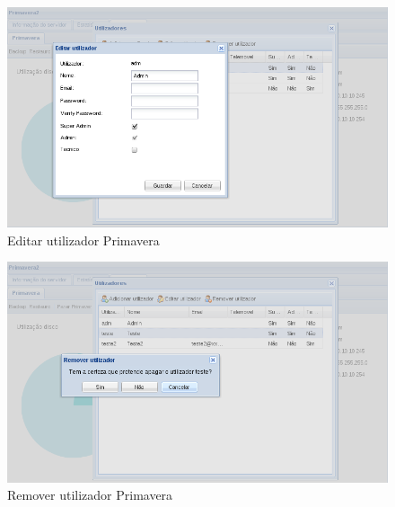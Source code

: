 \begin{figure}[H]
    \begin{center}
    \includegraphics[scale=0.38]{screenshots/primavera/primaverainterface_09.png}
    \caption{Editar utilizador Primavera}
    \label{fig:primavera_edit_user}
    \end{center}
\end{figure}

\begin{figure}[H]
    \begin{center}
    \includegraphics[scale=0.38]{screenshots/primavera/primaverainterface_10.png}
    \caption{Remover utilizador Primavera}
    \label{fig:primavera_delete_user}
    \end{center}
\end{figure}


